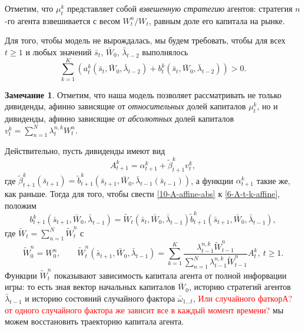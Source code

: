 \documentclass[a4paper,12pt,russian]{article} %
\theoremstyle{definition}
\newtheorem{remark}{Замечание}
\renewcommand{\tilde}{\widetilde}
\begin{document}
Отметим, что $\mu_{t}^k$ представляет собой \emph{взвешенную стратегию} агентов: стратегия $n$-го агента взвешивается с весом $W_t^n/W_t$, равным доле его капитала на рынке.

Для того, чтобы модель не вырождалась, мы будем требовать, чтобы для всех $t\ge 1$ и любых значений $\bar s_{t}$, $\bar W_0$, $ \bar \lambda_{t-2}$ выполнялось
\begin{equation}
\label{9-a-b-assumption}
\sum_{k=1}^K (a_{t}^k(\bar s_{t}, \bar W_0, \bar\lambda_{t-2}) + b_{t}^k (\bar s_{t}, \bar W_0, \bar\lambda_{t-2})) > 0.
\end{equation}

\begin{remark}
\label{remark-abs-wealth}
Отметим, что наша модель позволяет рассматривать не только дивиденды, 
афинно зависящие от \emph{относительных} долей капиталов $\mu_t^k$, но и дивиденды, афинно зависящие от \emph{абсолютных} долей капиталов $v_{t}^k = \sum_{n=1}^N \lambda_{t}^{n,k} W_t^n$. 

Действительно, пусть дивиденды имеют вид
\begin{equation}
\label{10-A-affine-abs}
A_{t+1}^k = \alpha_{t+1}^k + \tilde \beta_{t+1}^k v_{t}^k,
\end{equation}
где $\tilde \beta_{t+1}^k( \bar s_{t+1}) = \tilde b_{t+1}^k(\bar s_{t+1},\bar W_0, \bar\lambda_{t-1} ( \bar s_{t-1} ))$, а функции $\alpha_{t+1}^k$ такие же, как раньше. Тогда для того, чтобы свести \eqref{10-A-affine-abs} к \eqref{6-A-t-k-affine}, положим
\[
b_{t+1}^k( \bar s_{t+1},\bar W_0, \bar\lambda_{t-1} ) 
= \tilde W_t( \bar s_{t},\bar W_0, \bar\lambda_{t-1} ) 
  \tilde b_{t+1}^k( \bar s_{t+1},\bar W_0, \bar\lambda_{t-1} ), 
\]
где $\tilde W_t = \sum_{n=1}^N \tilde W_t^n$ с 
\[
\tilde W_0^n = W_0^n, \qquad
\tilde W_t^n( \bar s_{t+1},\bar W_0, \bar\lambda_{t-1} ) 
  = \sum_{k=1}^K
    \frac{\lambda_{t-1}^{n,k} \tilde W_{t-1}^n}
         {\sum_{n=1}^N \lambda_{t-1}^{n,k} \tilde W_{t-1}^n} A_{t}^k,\ t\ge 1.
\]
Функции  $\tilde W_t^n$ показывают зависимость капитала агента от полной инфорвации игры: то есть зная вектор начальных капиталов $\bar W_0$, историю стратегий агентов $\bar\lambda_{t-1}$ и историю состояний случайного фактора $\bar \omega_{1\dots t}$,  \textcolor{red} { Или случайного фаткорА? от одного случайного фактора же зависит  все в каждый момент времени?} мы можем восстановить траекторию капитала агента.
\end{remark}
\end{document}
